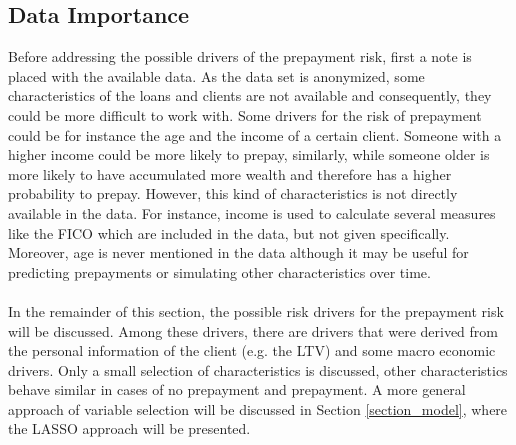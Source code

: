 \subsection{Data Importance}
    Before addressing the possible drivers of the prepayment risk, 
    first a note is placed with the available data.  
    As the data set is anonymized, some characteristics of the loans and 
    clients are not available and consequently, they could be more difficult to work with. 
    Some drivers for the risk of prepayment could be 
    for instance the age and the income of a certain client. 
    Someone with a 
    higher income could be more likely to prepay, similarly, while someone older is 
    more likely to have accumulated more wealth and therefore has a higher 
    probability to prepay. 
    However, this kind of characteristics is not directly available in the 
    data.
    For instance,
    income is used to calculate several measures like the FICO which are included in the
    data, but not given specifically. 
    Moreover, age is never mentioned in the data although it 
    may be useful for predicting prepayments or simulating other 
    characteristics over time.  
    \\\\
    In the remainder of this section, the possible risk drivers 
    for the prepayment risk will be discussed. Among these drivers, 
    there are drivers that were derived from the personal information
    of the client (e.g. the LTV) and some macro economic drivers. 
    Only a small selection of characteristics is discussed, other 
    characteristics behave similar in cases of no prepayment and 
    prepayment. 
    A more general approach of variable selection will be discussed 
    in Section \ref{section_model}, where the LASSO approach will
    be presented. 
    
